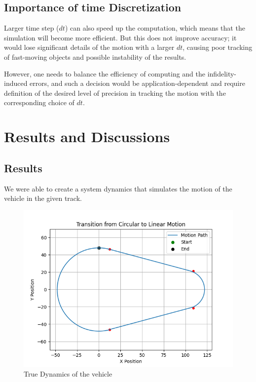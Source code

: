 \documentclass[a4paper,11pt]{article}
\begin{document}
\subsection*{Importance of time Discretization}
Larger time step ($dt$) can also speed up the computation, which means that the simulation will become more efficient. But this does not improve accuracy; it would lose significant details of the motion with a larger $dt$, causing poor tracking of fast-moving objects and possible instability of the results.

However, one needs to balance the efficiency of computing and the infidelity-induced errors, and such a decision would be application-dependent and require definition of the desired level of precision in tracking the motion with the corresponding choice of $dt$.

\section*{Results and Discussions}

\subsection*{Results}
We were able to create a system dynamics that simulates the motion of the vehicle in the given track.

\begin{figure} [H]
    \centering
    \includegraphics[width=0.8\linewidth]{Figure_1.png}
    \caption{True Dynamics of the vehicle}
    \label{fig:1}
\end{figure}
\end{document}
